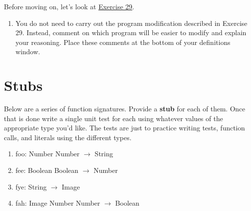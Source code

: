 \documentclass[nobib]{tufte-handout}
\begin{document}
Before moving on, let's look at \href{http://htdp.org/2018-01-06/Book/part_one.html#%28counter._%28exercise._fun7%29%29}{Exercise 29}.

\begin{enumerate}[resume]
  \item You do not need to carry out the program modification described in Exercise 29. Instead, comment on which program will be easier to modify and explain your reasoning. Place these comments at the bottom of your definitions window.

\end{enumerate}


\section*{Stubs}

Below are a series of function signatures. Provide a \textbf{stub} for each of them. Once that is done write a single unit test for each using whatever values of the appropriate type you'd like. The tests are just to practice writing tests, function calls, and literals using the different types.

\begin{enumerate}[resume]
  \item foo: Number Number $\rightarrow$ String
  \item fee: Boolean Boolean $\rightarrow$ Number
  \item fye: String $\rightarrow$ Image
  \item fah: Image Number Number $\rightarrow$ Boolean
\end{enumerate}
\end{document}
